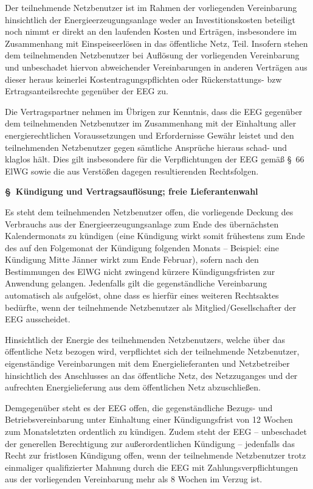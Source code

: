 \documentclass[a4paper,11pt]{article}
\newcounter{parasec}
\newcommand{\parasec}[1]{%
  \stepcounter{parasec}%
  \par\Needspace*{5\baselineskip}%
  \bigskip
  {\large\bfseries\color{tuerkis}\S\ \theparasec\quad #1}\par\nopagebreak
  \smallskip\nopagebreak
}
\begin{document}
Der teilnehmende Netzbenutzer ist im Rahmen der vorliegenden Vereinbarung hinsichtlich der Energieerzeugungsanlage weder an Investitionskosten beteiligt noch nimmt er direkt an den laufenden Kosten und Erträgen, insbesondere im Zusammenhang mit Einspeiseerlösen in das öffentliche Netz, Teil. Insofern stehen dem teilnehmenden Netzbenutzer bei Auflösung der vorliegenden Vereinbarung und unbeschadet hiervon abweichender Vereinbarungen in anderen Verträgen aus dieser heraus keinerlei Kostentragungspflichten oder Rückerstattungs- bzw Ertragsanteilsrechte gegenüber der EEG zu.

Die Vertragspartner nehmen im Übrigen zur Kenntnis, dass die EEG gegenüber dem teilnehmenden Netzbenutzer im Zusammenhang mit der Einhaltung aller energierechtlichen Voraussetzungen und Erfordernisse Gewähr leistet und den teilnehmenden Netzbenutzer gegen sämtliche Ansprüche hieraus schad- und klaglos hält. Dies gilt insbesondere für die Verpflichtungen der EEG gemäß \S\ 66 ElWG sowie die aus Verstößen dagegen resultierenden Rechtsfolgen.

\parasec{Kündigung und Vertragsauflösung; freie Lieferantenwahl}

Es steht dem teilnehmenden Netzbenutzer offen, die vorliegende Deckung des Verbrauchs aus der Energieerzeugungsanlage zum Ende des übernächsten Kalendermonats zu kündigen (eine Kündigung wirkt somit frühestens zum Ende des auf den Folgemonat der Kündigung folgenden Monats -- Beispiel: eine Kündigung Mitte Jänner wirkt zum Ende Februar), sofern nach den Bestimmungen des ElWG nicht zwingend kürzere Kündigungsfristen zur Anwendung gelangen. Jedenfalls gilt die gegenständliche Vereinbarung automatisch als aufgelöst, ohne dass es hierfür eines weiteren Rechtsaktes bedürfte, wenn der teilnehmende Netzbenutzer als Mitglied/Gesellschafter der EEG ausscheidet.

Hinsichtlich der Energie des teilnehmenden Netzbenutzers, welche über das öffentliche Netz bezogen wird, verpflichtet sich der teilnehmende Netzbenutzer, eigenständige Vereinbarungen mit dem Energielieferanten und Netzbetreiber hinsichtlich des Anschlusses an das öffentliche Netz, des Netzzuganges und der aufrechten Energielieferung aus dem öffentlichen Netz abzuschließen.

Demgegenüber steht es der EEG offen, die gegenständliche Bezugs- und Betriebsvereinbarung unter Einhaltung einer Kündigungsfrist von 12 Wochen zum Monatsletzten ordentlich zu kündigen. Zudem steht der EEG -- unbeschadet der generellen Berechtigung zur außerordentlichen Kündigung -- jedenfalls das Recht zur fristlosen Kündigung offen, wenn der teilnehmende Netzbenutzer trotz einmaliger qualifizierter Mahnung durch die EEG mit Zahlungsverpflichtungen aus der vorliegenden Vereinbarung mehr als 8 Wochen im Verzug ist.
\end{document}
